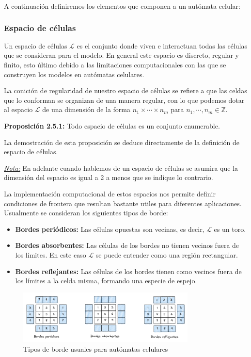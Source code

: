 A continuación definiremos los elementos que componen a un autómata celular:

\subsubsection{Espacio de células}

Un espacio de células $\mathcal{L}$ es el conjunto donde viven e interactuan todas las células que se consideran para el modelo. En general este espacio es discreto, regular y finito, esto último debido a las limitaciones computacionales con las que se construyen los modelos en autómatas celulares.

La conición de regularidad de nuestro espacio de células se refiere a que las celdas que lo conforman se organizan de una manera regular, con lo que podemos dotar al espacio $\mathcal{L}$ de una dimensión de la forma $n_1\times\cdots\times n_m$ para $n_1,\cdots,n_m\in\mathbb{Z}$.

\textbf{Proposición 2.5.1:} Todo espacio de células es un conjunto enumerable.

La demostración de esta proposición se deduce directamente de la definición de espacio de células.

\underline{\textit{Nota:}} En adelante cuando hablemos de un espacio de células se asumira que la dimensión del espacio es igual a 2 a menos que se indique lo contrario.

La implementación computacional de estos espacios nos permite definir condiciones de frontera que resultan bastante utiles para diferentes aplicaciones. Usualmente se consideran los siguientes tipos de borde:

\begin{itemize}
    \item \textbf{Bordes periódicos:} Las células opuestas son vecinas, es decir, $\mathcal{L}$ es un toro.
    \item \textbf{Bordes absorbentes:} Las células de los bordes no tienen vecinos fuera de los límites. En este caso $\mathcal{L}$ se puede entender como una región rectangular.
    \item \textbf{Bordes reflejantes:} Las células de los bordes tienen como vecinos fuera de los límites a la celda misma, formando una especie de espejo.
\end{itemize}

\begin{figure}[h]
  \centering
    \includegraphics[width=0.8\textwidth]{Imagenes/Tipos_de_borde.PNG}
  \caption{Tipos de borde usuales para autómatas celulares}
  \label{fig:Tipos de borde}
\end{figure}
    

